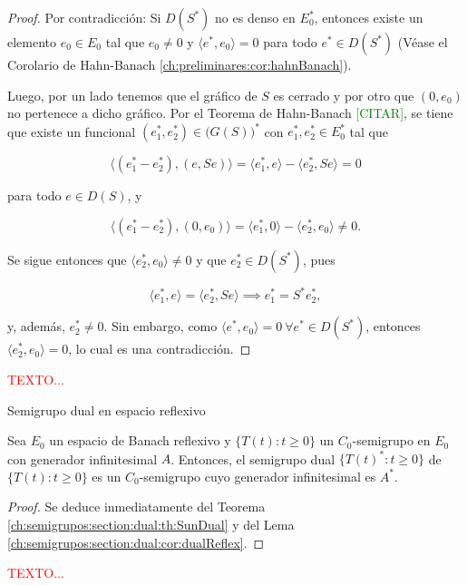 \begin{proof}
    Por contradicción: Si $D(S^*)$ no es denso en $E_0^*$, entonces existe un elemento $e_0 \in E_0$ tal que $e_0 \neq 0$ y $\langle e^*, e_0 \rangle = 0$ para todo $e^* \in D(S^*)$ (Véase el Corolario de Hahn-Banach \ref{ch:preliminares:cor:hahnBanach}).

    Luego, por un lado tenemos que el gráfico de $S$ es cerrado y por otro que $(0,e_0)$ no pertenece a dicho gráfico. Por el Teorema de Hahn-Banach \textcolor{green}{[CITAR]}, se tiene que existe un funcional $(e_1^*, e_2^*) \in \big(G(S)\big)^*$ con $e_1^*, e_2^* \in E_0^*$ tal que

    \[\langle (e_1^* - e_2^*), (e, Se) \rangle = \langle e_1^*, e\rangle - \langle e_2^*, Se \rangle = 0\]

    para todo $e \in D(S)$, y

    \[\langle (e_1^* - e_2^*), (0,e_0)\rangle = \langle e_1^*, 0 \rangle - \langle e_2^*, e_0 \rangle \neq 0.\]

    Se sigue entonces que $\langle e_2^*, e_0 \rangle \neq 0$ y que $e_2^* \in D(S^*)$, pues

    \[\langle e_1^*, e \rangle = \langle e_2^*, Se \rangle \implies e_1^* = S^* e_2^*,\]

    y, además, $e_2^* \neq 0$. Sin embargo, como $\langle e^*, e_0 \rangle = 0 \ \forall e^* \in D(S^*)$, entonces $\langle e_2^*, e_0 \rangle = 0$, lo cual es una contradicción.
\end{proof}

\textcolor{red}{TEXTO...}\\

\begin{Corolario}{Semigrupo dual en espacio reflexivo}
    \label{ch:semigrupos:section:dual:cor:dualReflex}

    Sea $E_0$ un espacio de Banach reflexivo y $\{T(t) : t \geq 0\}$ un $C_0$-semigrupo en $E_0$ con generador infinitesimal $A$. Entonces, el semigrupo dual $\{T(t)^* : t \geq 0\}$ de $\{T(t) : t \geq 0\}$ es un $C_0$-semigrupo cuyo generador infinitesimal es $A^*$.
\end{Corolario}

\begin{proof}
    Se deduce inmediatamente del Teorema \ref{ch:semigrupos:section:dual:th:SunDual} y del Lema \ref{ch:semigrupos:section:dual:cor:dualReflex}.
\end{proof}

\textcolor{red}{TEXTO...}\\

